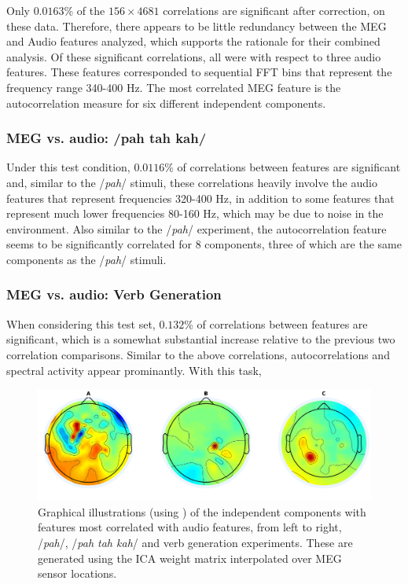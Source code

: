\documentclass[a4paper]{article}
\begin{document}
Only $0.0163$\% of the $156 \times 4681$ correlations are significant after correction, on these data. Therefore, there appears to be little redundancy between the MEG and Audio features analyzed, which supports the rationale for their combined analysis. Of these significant correlations, all were with respect to three audio features. These features corresponded to sequential FFT bins that represent the frequency range 340-400 Hz. The most correlated MEG feature is the autocorrelation measure for six different independent components.

\subsubsection{MEG vs. audio: /pah tah kah/}

Under this test condition, $0.0116$\% of correlations between features are significant and, similar to the /{\em pah}/ stimuli, these correlations heavily involve the audio features that represent frequencies 320-400 Hz, in addition to some features that represent much lower frequencies 80-160 Hz, which may be due to noise in the environment. Also similar to the /{\em pah}/ experiment, the autocorrelation feature seems to be significantly correlated for 8 components, three of which are the same components as the /{\em pah}/ stimuli.


\subsubsection{MEG vs. audio: Verb Generation}

When considering this test set, $0.132$\% of correlations between features are significant, which is a somewhat substantial increase relative to the previous two correlation comparisons. Similar to the above correlations, autocorrelations and spectral activity appear prominantly. With this task,

\begin{figure}[t]
  \centering
  \includegraphics[width=\linewidth]{AllComponents.png}
  \caption{Graphical illustrations (using \cite{Delorme04eeglab}) of the independent components with features most correlated with audio features, from left to right, /{\em pah}/, /{\em pah tah kah}/ and verb generation experiments. These are generated using the ICA weight matrix interpolated over MEG sensor locations. }
  \label{fig:components}
\end{figure}
\end{document}
